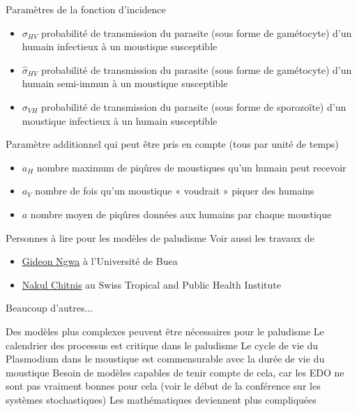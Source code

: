 \documentclass[aspectratio=169]{beamer}\usepackage[]{graphicx}\usepackage[]{xcolor}
\begin{document}
\begin{frame}{Paramètres de la fonction d'incidence}
\begin{itemize}
\item $\sigma_{HV}$ probabilité de transmission du parasite (sous forme de gamétocyte) d'un
humain infectieux à un moustique susceptible
\item $\hat\sigma_{HV}$ probabilité de transmission du parasite (sous forme de gamétocyte) d'un
humain semi-immun à un moustique susceptible
\item $\sigma_{VH}$ probabilité de transmission du parasite (sous forme de sporozoïte) d'un
moustique infectieux à un humain susceptible
\end{itemize}
\vfill
Paramètre additionnel qui peut être pris en compte (tous par unité de temps)
\begin{itemize}
\item $a_H$ nombre maximum de piqûres de moustiques qu'un humain peut recevoir
\item $a_V$ nombre de fois qu'un moustique « voudrait » piquer des humains
\item $a$ nombre moyen de piqûres données aux humains par chaque moustique
\end{itemize}
\end{frame}

\begin{frame}{Personnes à lire pour les modèles de paludisme}
Voir aussi les travaux de 
\vfill
\begin{itemize}
\item \href{https://scholar.google.com/citations?user=AwKMfZ8AAAAJ&hl=en}{Gideon Ngwa} à l'Université de Buea
\vfill
\item \href{https://scholar.google.ch/citations?user=BMiKO0UAAAAJ&hl=en}{Nakul Chitnis} au Swiss Tropical and Public Health Institute
\end{itemize}
\vfill
Beaucoup d'autres...
\end{frame}


\begin{frame}{Des modèles plus complexes peuvent être nécessaires pour le paludisme}
Le calendrier des processus est critique dans le paludisme
\vfill
Le cycle de vie du Plasmodium dans le moustique est commensurable avec la durée de vie du moustique
\vfill
Besoin de modèles capables de tenir compte de cela, car les EDO ne sont pas vraiment bonnes pour cela (voir le début de la conférence sur les systèmes stochastiques)
\vfill
Les mathématiques deviennent plus compliquées
\end{frame}
\end{document}
